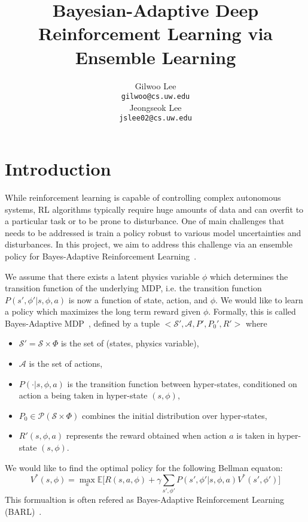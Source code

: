 \documentclass{article}
\title{Bayesian-Adaptive Deep Reinforcement Learning via Ensemble Learning}
\author{Gilwoo Lee \\
  \texttt{gilwoo@cs.uw.edu} \\
  \And
  Jeongseok Lee \\
  \texttt{jslee02@cs.uw.edu}
}
\begin{document}

\maketitle

\section{Introduction}
While reinforcement learning is capable of controlling complex autonomous systems, RL algorithms typically require huge amounts of data and can overfit to a particular task or to be prone to disturbance. One of main challenges that needs to be addressed is train a policy robust to various model uncertainties and disturbances. In this project, we aim to address this challenge via an ensemble policy for Bayes-Adaptive Reinforcement Learning~\cite{ghavamzadeh2015bayesian}.

We assume that there exists a latent physics variable $\phi$ which determines the transition function of the underlying MDP, i.e. the transition function  $P(s',\phi' |s, \phi, a)$ is now a function of state, action, and $\phi$. We would like to learn a policy which maximizes the long term reward given $\phi$. Formally, this is called Bayes-Adaptive MDP~\cite{ghavamzadeh2015bayesian, guez2012efficient}, defined by a tuple $<\mathcal{S}', \mathcal{A}, P', P_0', R'>$ where
\begin{itemize}
\item $\mathcal{S'} = \mathcal{S}\times \Phi$ is the set of (states, physics variable),
\item $\mathcal{A}$ is the set of actions,
\item $P(\cdot|s, \phi, a)$ is the transition function between hyper-states, conditioned
on action a being taken in hyper-state $(s, \phi)$,
\item $P_0\in \mathcal{P}(\mathcal{S} \times \Phi)$ combines the initial distribution over hyper-states,
\item $R'(s, \phi, a)$ represents the reward obtained when action $a$ is
taken in hyper-state $(s,\phi)$.
\end{itemize}

We would like to find the optimal policy for the following Bellman equaton:
\begin{equation}\label{eq:rl}
V^*(s, \phi) = \max_a \mathbb{E} \bigg[R(s, a, \phi) + \gamma \sum_{s', \phi'}P(s',\phi'|s, \phi, a)V^*(s', \phi') \bigg]
\end{equation}
This formualtion is often refered as Bayes-Adaptive Reinforcement Learning (BARL)~\cite{ghavamzadeh2015bayesian}.
\end{document}
